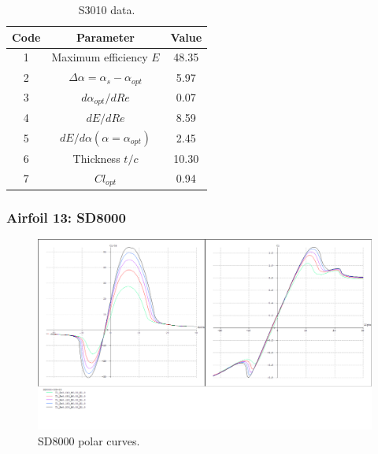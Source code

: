 \documentclass[../TFG_Annex.tex]{subfiles}
\begin{document}
\begin{table}[h!]
	\centering
	\begin{tabular}{c|c|c}
		Code & Parameter                                    & Value  \\ \hline
		1    & Maximum efficiency $E$                      &   48.35      \\
		2    & $\Delta \alpha=\alpha_{s}-\alpha_{opt}$    &         5.97          \\
		3    & ${d\alpha_{opt}}/{dRe}$                     &            0.07     \\
		4    & ${dE}/{dRe}$                                &        8.59     \\
		5    & ${dE}/{d \alpha} (\alpha=\alpha_{opt})$      &           2.45        \\
		6    & Thickness $t/c$                            &              10.30      \\
		7    & $Cl_{opt}$  &   0.94
	\end{tabular}
	\caption{S3010 data.}
	\label{tab:Airf12}
\end{table}




\newpage
\subsubsection{Airfoil 13: SD8000}


\begin{figure}[h!]
	\centering
	\includegraphics[width=1\linewidth]{"../../04-Airfoil selection/Imatges airfoils/13-SD8000"}
	\caption{SD8000 polar curves.}
	\label{fig:13-sd8000}
\end{figure}
\end{document}
